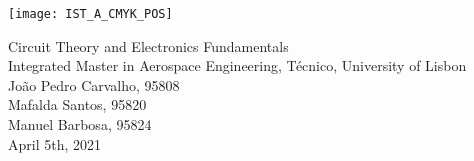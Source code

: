 
\thispagestyle {empty}

\texttt{[image: IST\_A\_CMYK\_POS]}

\begin{center}
%
\vspace{1.0cm}

\vspace{1cm}
{\FontLb Circuit Theory and Electronics Fundamentals} \\ %
\vspace{1cm}
{\FontSn Integrated Master in Aerospace Engineering, Técnico, University of Lisbon} \\ %
\vspace{1cm}
{\FontSn João Pedro Carvalho, 95808} \\
\vspace{0.3cm}
{\FontSn Mafalda Santos, 95820} \\
\vspace{0.3cm}
{\FontSn Manuel Barbosa, 95824} \\
\vspace{1cm}
{\FontSn April 5th, 2021} \\ %
%
\end{center}



